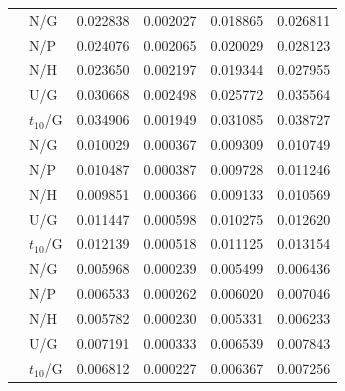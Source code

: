 \begin{table}[H]
\begin{tabular}{@{}rlrrrr@{}}
\addlinespace[3pt]
1024 & N/G & 0.022838 & 0.002027 & 0.018865 & 0.026811\\
 & N/P & 0.024076 & 0.002065 & 0.020029 & 0.028123\\
 & N/H & 0.023650 & 0.002197 & 0.019344 & 0.027955\\
 & U/G & 0.030668 & 0.002498 & 0.025772 & 0.035564\\
 & $t_{10}$/G & 0.034906 & 0.001949 & 0.031085 & 0.038727\\
\addlinespace[3pt]
2048 & N/G & 0.010029 & 0.000367 & 0.009309 & 0.010749\\
 & N/P & 0.010487 & 0.000387 & 0.009728 & 0.011246\\
 & N/H & 0.009851 & 0.000366 & 0.009133 & 0.010569\\
 & U/G & 0.011447 & 0.000598 & 0.010275 & 0.012620\\
 & $t_{10}$/G & 0.012139 & 0.000518 & 0.011125 & 0.013154\\
\addlinespace[3pt]
4096 & N/G & 0.005968 & 0.000239 & 0.005499 & 0.006436\\
 & N/P & 0.006533 & 0.000262 & 0.006020 & 0.007046\\
 & N/H & 0.005782 & 0.000230 & 0.005331 & 0.006233\\
 & U/G & 0.007191 & 0.000333 & 0.006539 & 0.007843\\
 & $t_{10}$/G & 0.006812 & 0.000227 & 0.006367 & 0.007256\\
\bottomrule
\end{tabular}
\end{table}
